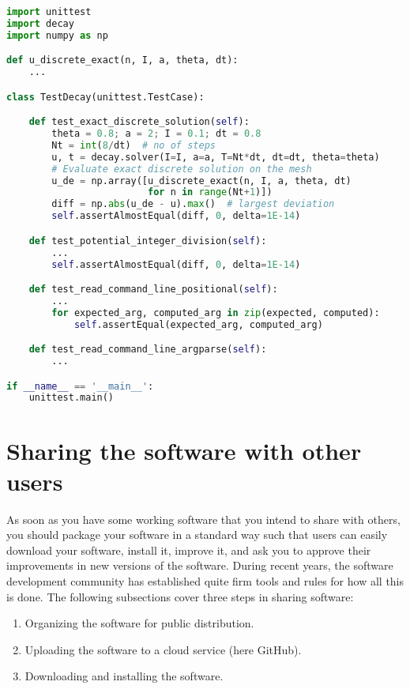 \documentclass[graybox,sectrefs,envcountresetchap,open=right,final]{svmonodo}
\begin{document}
\begin{lstlisting}[language=python,style=blue1_bluegreen]
import unittest
import decay
import numpy as np

def u_discrete_exact(n, I, a, theta, dt):
    ...

class TestDecay(unittest.TestCase):

    def test_exact_discrete_solution(self):
        theta = 0.8; a = 2; I = 0.1; dt = 0.8
        Nt = int(8/dt)  # no of steps
        u, t = decay.solver(I=I, a=a, T=Nt*dt, dt=dt, theta=theta)
        # Evaluate exact discrete solution on the mesh
        u_de = np.array([u_discrete_exact(n, I, a, theta, dt)
                         for n in range(Nt+1)])
        diff = np.abs(u_de - u).max()  # largest deviation
        self.assertAlmostEqual(diff, 0, delta=1E-14)

    def test_potential_integer_division(self):
        ...
        self.assertAlmostEqual(diff, 0, delta=1E-14)

    def test_read_command_line_positional(self):
        ...
        for expected_arg, computed_arg in zip(expected, computed):
            self.assertEqual(expected_arg, computed_arg)

    def test_read_command_line_argparse(self):
        ...

if __name__ == '__main__':
    unittest.main()

\end{lstlisting}


\section{Sharing the software with other users}
\label{softeng1:prog:se:git}

As soon as you have some working software that you intend to share
with others, you should package your software in a standard way such
that users can easily download your software, install it, improve it,
and ask you to approve their improvements in new versions of the software.
During recent years, the software development community has established
quite firm tools and rules for how all this is done. The following
subsections cover three steps in sharing software:

\begin{enumerate}
\item Organizing the software for public distribution.

\item Uploading the software to a cloud service (here GitHub).

\item Downloading and installing the software.
\end{enumerate}
\end{document}
